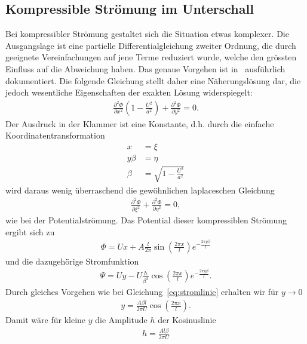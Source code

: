 \subsection{Kompressible Strömung im Unterschall}
Bei kompressibler Strömung gestaltet sich die Situation etwas komplexer.
Die Ausgangslage ist eine partielle Differentialgleichung zweiter Ordnung,
die durch geeignete Vereinfachungen auf jene Terme reduziert wurde, 
welche den grössten Einfluss auf die Abweichung haben.
Das genaue Vorgehen ist in~\cite{Ackeret1928} ausführlich dokumentiert.
Die folgende Gleichung stellt daher eine Näherungslösung dar,
die jedoch wesentliche Eigenschaften der exakten Lösung widerspiegelt:
\begin{align}
    \frac{\partial^2 \Phi}{\partial x^2} 
    \left(1-\frac{U^2}{a^2}\right)
    +
    \frac{\partial^2 \Phi}{\partial y^2}
    =
    0.\label{eq:kompressible_stroemung}
\end{align}
Der Ausdruck in der Klammer ist eine Konstante, d.h.
durch die einfache Koordinatentransformation
\begin{align*}
    x 
    &=
    \xi \\
    y \beta
    &=
    \eta \\
    \beta
    &=
    \sqrt{1-\frac{U^2}{a^2}}
\end{align*}
wird daraus wenig überraschend die gewöhnlichen laplaceschen Gleichung
\begin{align*}
    \frac{\partial^2 \Phi}{\partial \xi^2} 
    +
    \frac{\partial^2 \Phi}{\partial \eta^2}
    =
    0,
\end{align*}
wie bei der Potentialströmung.
Das Potential dieser kompressiblen Strömung ergibt sich zu
\begin{align*}
    \Phi
    =
    U x + A \frac{l}{2 \pi} \sin\left(\frac{2 \pi x}{l}\right)
     e^{-\frac{2 \pi y \beta}{l}}
\end{align*}
und die dazugehörige Stromfunktion
\begin{align*}
    \Psi
    =
    U y - U \frac{h}{\beta^2} \cos\left(\frac{2\pi x}{l}\right)
     e^{-\frac{2\pi y \beta}{l}}.
\end{align*}
Durch gleiches Vorgehen wie bei Gleichung~\eqref{eq:stromlinie}
erhalten wir für $y \to 0$
\begin{align*}
    y
    =
    \frac{A \beta l}{2 \pi U} 
    \cos\left(\frac{2 \pi x}{l}\right).
\end{align*}
Damit wäre für kleine $y$ die Amplitude $h$ der Kosinuslinie
\begin{align*}
    h
    =
    \frac{A l \beta}{2 \pi U}
\end{align*}
